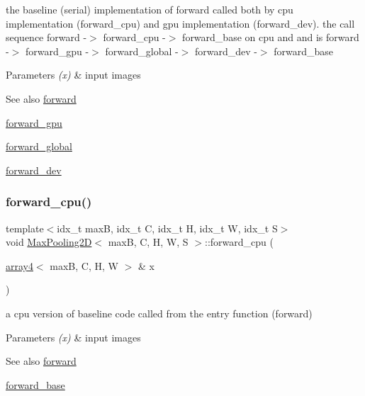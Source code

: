 the baseline (serial) implementation of forward called both by cpu implementation (forward\+\_\+cpu) and gpu implementation (forward\+\_\+dev). the call sequence forward -\/$>$ forward\+\_\+cpu -\/$>$ forward\+\_\+base on cpu and and is forward -\/$>$ forward\+\_\+gpu -\/$>$ forward\+\_\+global -\/$>$ forward\+\_\+dev -\/$>$ forward\+\_\+base 


\begin{DoxyParams}{Parameters}
{\em (x)} & input images \\
\hline
\end{DoxyParams}
\begin{DoxySeeAlso}{See also}
\hyperlink{structMaxPooling2D_ac533b4e08d8f2e708bbdc8f8e2d784a2}{forward} 

\hyperlink{structMaxPooling2D_a4e8ee0e7bf1cc0b7688fbbe1b04019ec}{forward\+\_\+gpu} 

\hyperlink{softmaxcrossentropy_8h_a578aeeb166bd06e800d9b396eab48b35}{forward\+\_\+global} 

\hyperlink{structMaxPooling2D_a978800c6648a820257f2934e9970e12e}{forward\+\_\+dev} 
\end{DoxySeeAlso}
\mbox{\label{structMaxPooling2D_a3f9af927ce1e269b42c097bdb64ef90a}} 
\subsubsection{\texorpdfstring{forward\+\_\+cpu()}{forward\_cpu()}}
{\footnotesize\ttfamily template$<$idx\+\_\+t maxB, idx\+\_\+t C, idx\+\_\+t H, idx\+\_\+t W, idx\+\_\+t S$>$ \\
void \hyperlink{structMaxPooling2D}{Max\+Pooling2D}$<$ maxB, C, H, W, S $>$\+::forward\+\_\+cpu (\begin{DoxyParamCaption}\item[{\hyperlink{structarray4}{array4}$<$ maxB, C, H, W $>$ \&}]{x }\end{DoxyParamCaption})\hspace{0.3cm}{\ttfamily [inline]}}



a cpu version of baseline code called from the entry function (forward) 


\begin{DoxyParams}{Parameters}
{\em (x)} & input images \\
\hline
\end{DoxyParams}
\begin{DoxySeeAlso}{See also}
\hyperlink{structMaxPooling2D_ac533b4e08d8f2e708bbdc8f8e2d784a2}{forward} 

\hyperlink{structMaxPooling2D_adde941f72d6c91ecb63253afb845dbfa}{forward\+\_\+base} 
\end{DoxySeeAlso}
\mbox{\label{structMaxPooling2D_a978800c6648a820257f2934e9970e12e}} 
